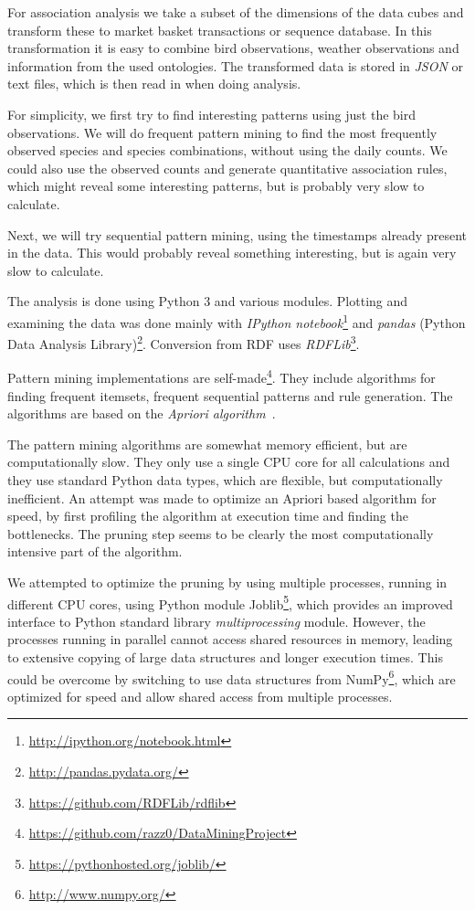 \documentclass[english]{tktltiki2}
\begin{document}
For association analysis we take a subset of the dimensions of the data cubes and transform these to market basket transactions or sequence database. In this transformation it is easy to combine bird observations, weather observations and information from the used ontologies. The transformed data is stored in \emph{JSON} or text files, which is then read in when doing analysis.

For simplicity, we first try to find interesting patterns using just the bird observations. We will do frequent pattern mining to find the most frequently observed species and species combinations, without using the daily counts. We could also use the observed counts and generate quantitative association rules, which might reveal some interesting patterns, but is probably very slow to calculate.

Next, we will try sequential pattern mining, using the timestamps already present in the data. This would probably reveal something interesting, but is again very slow to calculate.

The analysis is done using Python 3 and various modules. Plotting and examining the data was done mainly with \emph{IPython notebook}\footnote{\url{http://ipython.org/notebook.html}} and \emph{pandas} (Python Data Analysis Library)\footnote{\url{http://pandas.pydata.org/}}. Conversion from RDF uses \emph{RDFLib}\footnote{\url{https://github.com/RDFLib/rdflib}}. 

Pattern mining implementations are self-made\footnote{\url{https://github.com/razz0/DataMiningProject}}. They include algorithms for finding frequent itemsets, frequent sequential patterns and rule generation. The algorithms are based on the \emph{Apriori algorithm}~\cite{tan2006introduction}.

The pattern mining algorithms are somewhat memory efficient, but are computationally slow. They only use a single CPU core for all calculations and they use standard Python data types, which are flexible, but computationally inefficient. An attempt was made to optimize an Apriori based algorithm for speed, by first profiling the algorithm at execution time and finding the bottlenecks. The pruning step seems to be clearly the most computationally intensive part of the algorithm. %

We attempted to optimize the pruning by using multiple processes, running in different CPU cores, using Python module Joblib\footnote{\url{https://pythonhosted.org/joblib/}}, which provides an improved interface to Python standard library \emph{multiprocessing} module. However, the processes running in parallel cannot access shared resources in memory, leading to extensive copying of large data structures and longer execution times. This could be overcome by switching to use data structures from NumPy\footnote{\url{http://www.numpy.org/}}, which are optimized for speed and allow shared access from multiple processes.
\end{document}
